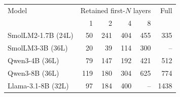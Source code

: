 \begin{tabular}{lrrrrr}
\toprule
Model & \multicolumn{4}{c}{Retained first-$N$ layers} & Full \\
 & 1 & 2 & 4 & 8 & \\
\midrule
 SmolLM2-1.7B (24L) & 50 & 241 & 404 & 455 & 335 \\
 SmolLM3-3B (36L) & 20 & 39 & 114 & 300 & -- \\
 Qwen3-4B (36L) & 79 & 147 & 192 & 421 & 512 \\
 Qwen3-8B (36L) & 119 & 180 & 304 & 625 & 774 \\
 Llama-3.1-8B (32L) & 97 & 184 & 400 & -- & 1438 \\
\bottomrule
\end{tabular}
